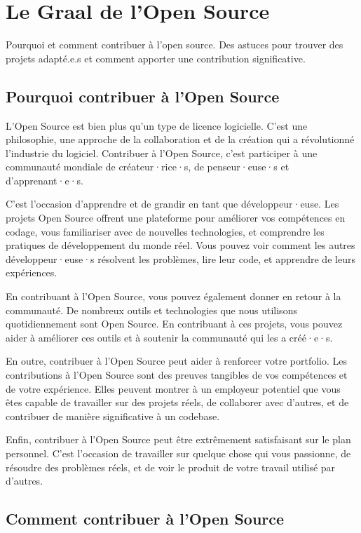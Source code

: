 \chapter{Le Graal de l'Open Source}

Pourquoi et comment contribuer à l'open source. Des astuces pour trouver des projets adapté.e.s et comment apporter une contribution significative.

\section{Pourquoi contribuer à l'Open Source}

L'Open Source est bien plus qu'un type de licence logicielle. C'est une philosophie, une approche de la collaboration et de la création qui a révolutionné l'industrie du logiciel. Contribuer à l'Open Source, c'est participer à une communauté mondiale de créateur·rice·s, de penseur·euse·s et d'apprenant·e·s.

C'est l'occasion d'apprendre et de grandir en tant que développeur·euse. Les projets Open Source offrent une plateforme pour améliorer vos compétences en codage, vous familiariser avec de nouvelles technologies, et comprendre les pratiques de développement du monde réel. Vous pouvez voir comment les autres développeur·euse·s résolvent les problèmes, lire leur code, et apprendre de leurs expériences.

En contribuant à l'Open Source, vous pouvez également donner en retour à la communauté. De nombreux outils et technologies que nous utilisons quotidiennement sont Open Source. En contribuant à ces projets, vous pouvez aider à améliorer ces outils et à soutenir la communauté qui les a créé·e·s.

En outre, contribuer à l'Open Source peut aider à renforcer votre portfolio. Les contributions à l'Open Source sont des preuves tangibles de vos compétences et de votre expérience. Elles peuvent montrer à un employeur potentiel que vous êtes capable de travailler sur des projets réels, de collaborer avec d'autres, et de contribuer de manière significative à un codebase.

Enfin, contribuer à l'Open Source peut être extrêmement satisfaisant sur le plan personnel. C'est l'occasion de travailler sur quelque chose qui vous passionne, de résoudre des problèmes réels, et de voir le produit de votre travail utilisé par d'autres.

\section{Comment contribuer à l'Open Source}

